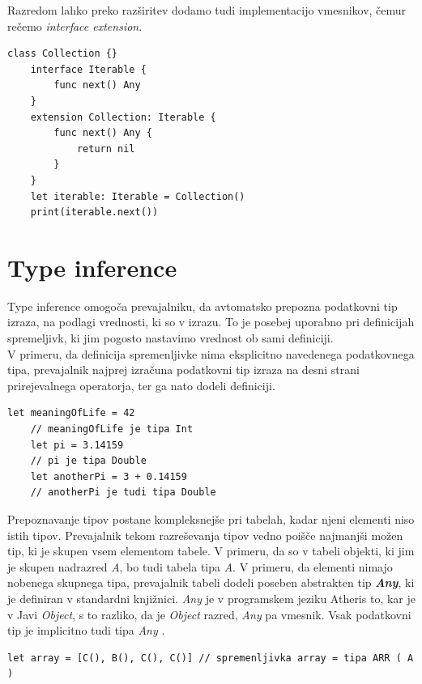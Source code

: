 \documentclass[a4paper, 12pt]{book}
\begin{document}
Razredom lahko preko razširitev dodamo tudi implementacijo vmesnikov, čemur rečemo \textit{interface extension}.

\begin{lstlisting}[caption=Razširitev z vmesnikom, captionpos=b]
	class Collection {}
	interface Iterable {
	    func next() Any
	}
	extension Collection: Iterable {
	    func next() Any {
	        return nil
	    }
	}
	let iterable: Iterable = Collection()
	print(iterable.next())
\end{lstlisting}

\section{Type inference}

Type inference omogoča prevajalniku, da avtomatsko prepozna podatkovni tip izraza, na podlagi vrednosti, ki so v izrazu. To je posebej uporabno pri definicijah spremeljivk, ki jim pogosto nastavimo vrednost ob sami definiciji. \\
\indent V primeru, da definicija spremenljivke nima eksplicitno navedenega podatkovnega tipa, prevajalnik najprej izračuna podatkovni tip izraza na desni strani prirejevalnega operatorja, ter ga nato dodeli definiciji.

\begin{lstlisting}[caption={Avtomatično prepoznavanje podatkovnih tipov}, captionpos=b]
	let meaningOfLife = 42
	// meaningOfLife je tipa Int
	let pi = 3.14159
	// pi je tipa Double
	let anotherPi = 3 + 0.14159
	// anotherPi je tudi tipa Double
\end{lstlisting}

Prepoznavanje tipov postane kompleksnejše pri tabelah, kadar njeni elementi niso istih tipov. Prevajalnik tekom razreševanja tipov vedno poišče najmanjši možen tip, ki je skupen vsem elementom tabele. V primeru, da so v tabeli objekti, ki jim je skupen nadrazred \textit{A}, bo tudi tabela tipa \textit{A}. V primeru, da elementi nimajo nobenega skupnega tipa, prevajalnik tabeli dodeli poseben abstrakten tip \textit{\textbf{Any}}, ki je definiran v standardni knjižnici. \textit{Any} je v programskem jeziku Atheris to, kar je v Javi \textit{Object}, s to razliko, da je \textit{Object} razred, \textit{Any} pa vmesnik. Vsak podatkovni tip je implicitno tudi tipa \textit{Any} .

\begin{lstlisting}[caption={Elementi tabele s skupnim nadrazredom}, captionpos=b]
	let array = [C(), B(), C(), C()] // spremenljivka array = tipa ARR ( A )
\end{lstlisting}
\end{document}
